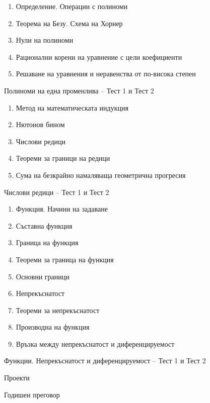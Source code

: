 \documentclass[12pt,a4paper]{article}
\begin{document}
{\vspace{0.5cm}
\par
\vspace{0.2cm}
\par
\begin{enumerate}[label=1.\arabic*.,leftmargin=1.5cm]
\item Определение. Операции с полиноми 
\item Теорема на Безу. Схема на Хорнер 
\item Нули на полиноми 
\item Рационални корени на уравнение с цели коефициенти 
\item Решаване на уравнения и неравенства от по-висока степен 
\end{enumerate}
\noindent Полиноми на една променлива -- Тест 1 и Тест 2 

\vspace{0.3cm}
\par
\begin{enumerate}[label=2.\arabic*.,leftmargin=1.5cm]
\item Метод на математическата индукция 
\item Нютонов бином 
\item Числови редици 
\item Теореми за граници на редици 
\item Сума на безкрайно намаляваща геометрична прогресия 
\end{enumerate}
\noindent Числови редици -- Тест 1 и Тест 2 

\vspace{0.3cm}
\par
\begin{enumerate}[label=3.\arabic*.,leftmargin=1.5cm]
\item Функция. Начини на задаване 
\item Съставна функция 
\item Граница на функция 
\item Теореми за граница на функция 
\item Основни граници 
\item Непрекъснатост 
\item Теореми за непрекъснатост 
\item Производна на функция 
\item Връзка между непрекъснатост и диференцируемост 
\end{enumerate}
\noindent Функции. Непрекъснатост и диференцируемост -- Тест 1 и Тест 2 \par
\noindent Проекти \par
\noindent Годишен преговор 

}
\end{document}
